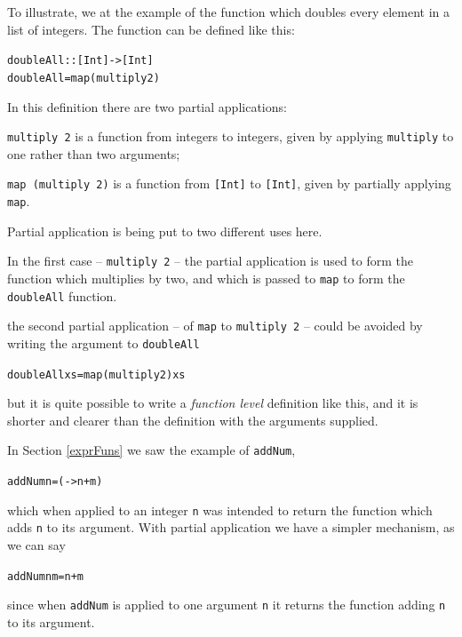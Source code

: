 \noindent
To illustrate, we at the example of the function which doubles every element in a list of integers. The function can be defined like this:
\begin{alltt}
doubleAll :: [Int] -> [Int]
doubleAll = map (multiply 2)
\end{alltt}
In this definition there are two partial applications:
\begin{titemize}
\item \texttt{multiply 2} is a function from integers to integers, given by
applying \texttt{multiply} to one rather than two arguments;
\item \texttt{map (multiply 2)} is a function from \texttt{[Int]} to \texttt{[Int]},
given by partially applying \texttt{map}.
\end{titemize}
Partial application is being put to two different uses here.
\begin{titemize}
\item In the first case -- \texttt{multiply 2} -- the partial
application is used to form the function which
multiplies by two, and which is passed to \texttt{map} to form
the \texttt{doubleAll} function.
\item the second partial application -- of \texttt{map} to
\texttt{multiply 2} -- could be avoided by writing the argument to \texttt{doubleAll} 
\begin{alltt}
doubleAll xs = map (multiply 2) xs
\end{alltt}
but it is quite possible to write a \emph{function level} definition like this, and it is shorter and clearer than the definition with the arguments supplied.
\end{titemize}
In Section \ref{exprFuns} we saw the example of \texttt{addNum}, 
\begin{alltt}
addNum n = ( -> n+m)
\end{alltt}
which when applied to an integer \texttt{n}
was intended to return the function which adds \texttt{n} to its
argument. With partial application we have a simpler mechanism, as we
can say
\begin{alltt}
addNum n m = n+m
\end{alltt}
since when \texttt{addNum} is applied to one argument \texttt{n} it returns the 
function adding \texttt{n} to its argument.

